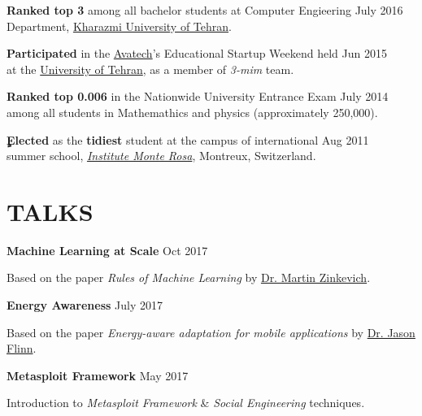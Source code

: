 \documentclass[margin, 10pt]{res} %
\begin{document}
\begin{resume}
	\textbf{Ranked top 3}
	among all bachelor students at Computer Engieering \hfill {July 2016}\\ Department, \href{http://khu.ac.ir}{Kharazmi University of Tehran}.
	
	\textbf{Participated}
	in the \href{http://avatech.ir}{Avatech}'s Educational Startup Weekend held \hfill {Jun 2015}\\at the \href{http://ut.ac.ir}{University of Tehran}, as a member of \textit{3-mim} team.
	
	\textbf{Ranked top 0.006}
	in the Nationwide University Entrance Exam \hfill {July 2014}\\ among all students in 
	Mathemathics and physics (approximately 250,000).
	
	\textbf{ٍElected}
	as the \textbf{tidiest} student at the campus of international \hfill {Aug 2011}\\ summer school, \textit{\href{https://www.monterosa.ch/}{Institute Monte Rosa}}, Montreux, Switzerland. 
    \end{resume}

\section{TALKS} 
\textbf{Machine Learning at Scale}
\hfill {Oct 2017}
\vspace{0.15cm}
\begin{innerlist}
	\item Based on the paper \textit{Rules of Machine Learning} by \href{http://martin.zinkevich.org/rules_of_ml/rules_of_ml.pdf}{Dr. Martin Zinkevich}.
\end{innerlist}

\textbf{Energy Awareness}
\hfill {July 2017}
\vspace{0.15cm}
\begin{innerlist}
	\item Based on the paper \textit{Energy-aware adaptation for mobile applications} by \href{http://www-cgi.cs.cmu.edu/afs/cs.cmu.edu/Web/People/odyssey/docdir/s17.pdf5}{Dr. Jason Flinn}.
\end{innerlist}

\textbf{Metasploit Framework}
\hfill {May 2017}
\vspace{0.15cm}
\begin{innerlist}
	\item Introduction to \textit{Metasploit Framework} \& \textit{Social Engineering} techniques.
\end{innerlist}
\end{document}

